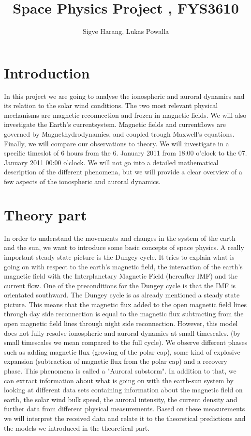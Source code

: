 \documentclass[10pt,a4paper]{article}
\author{Sigve Harang, Lukas Powalla}
\title{Space Physics Project , FYS3610}
\begin{document}
\maketitle
\newpage
\tableofcontents
\newpage
\section*{Introduction}
In this project we are going to analyse the ionospheric and auroral dynamics and its relation to the solar wind conditions. 
The two most relevant physical mechanisms are magnetic reconnection and frozen in magnetic fields. We will also investigate the Earth's currentsystem. Magnetic fields and 
currentflows are governed by Magnethydrodynamics, and coupled trough Maxwell's equations. Finally, we will compare our observations to theory. 
We will investigate in a specific timeslot of 6 hours from the 6. January 2011 from 18:00 o'clock to the 07. January 2011 00:00 o'clock. We will not go into a detailed mathematical
description of the different phenomena, but we will provide a clear overview of a few aspects of the ionospheric and auroral dynamics.
\section{Theory part} 
In order to understand the movements and changes in the system of the earth and the sun, we want to introduce some basic concepts of space physics.
A really important steady state picture is the Dungey cycle. It tries to explain what is going on with respect to the earth's magnetic field, the interaction of the earth's
magnetic field with the Interplanetary Magnetic Field (hereafter IMF) and the current flow. One of the preconditions for the Dungey cycle is that the IMF is orientated southward. The Dungey cycle is as already 
mentioned a steady state picture. This means that the magnetic flux added to the open magnetic field lines through day side reconnection is equal to the magnetic flux 
subtracting from the open magnetic field lines through night side reconnection. However, this model does not fully resolve ionospheric and auroral dynamics at small timescales. 
(by small timescales we mean compared to the full cycle). We observe different phases such as adding magnetic flux (growing of the polar cap), some kind of explosive expansion 
(subtraction of magnetic flux from the polar cap) and a recovery phase. This phenomena is called a "Auroral substorm". In addition to that, we can extract information 
about what is going on with the earth-sun system by looking at different data sets containing information about the magnetic field on earth, the solar wind bulk speed, 
the auroral intensity, the current density and further data from different physical measurements. Based on these measurements we will interpret the received data and relate 
it to the theoretical predictions and the models we introduced in the theoretical part.
\end{document}
